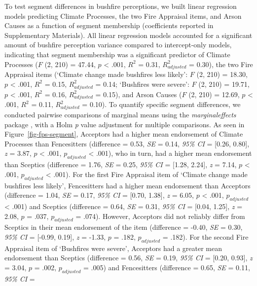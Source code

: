 \documentclass[
  letterpaper,
  DIV=11,
  numbers=noendperiod]{scrartcl}
\begin{document}
To test segment differences in bushfire perceptions, we built linear
regression models predicting Climate Processes, the two Fire Appraisal
items, and Arson Causes as a function of segment membership
(coefficients reported in Supplementary Materials). All linear
regression models accounted for a significant amount of bushfire
perception variance compared to intercept-only models, indicating that
segment membership was a significant predictor of Climate Processes
(\(F\) (2, 210) = 47.44, \(p\) \textless{} .001, \(R^2\) = 0.31,
\(R^2_{adjusted}\) = 0.30), the two Fire Appraisal items (`Climate
change made bushfires less likely': \(F\) (2, 210) = 18.30, \(p\)
\textless{} .001, \(R^2\) = 0.15, \(R^2_{adjusted}\) = 0.14; `Bushfires
were severe': \(F\) (2, 210) = 19.71, \(p\) \textless{} .001, \(R^2\) =
0.16, \(R^2_{adjusted}\) = 0.15), and Arson Causes (\(F\) (2, 210) =
12.69, \(p\) \textless{} .001, \(R^2\) = 0.11, \(R^2_{adjusted}\) =
0.10). To quantify specific segment differences, we conducted pairwise
comparisons of marginal means using the \emph{marginaleffects} package
\citep{R-marginaleffects}, with a Holm \citeyearpar{holm1979} \emph{p}
value adjustment for multiple comparisons. As seen in
Figure~\ref{fig-fps-segment}, Acceptors had a higher mean endorsement of
Climate Processes than Fencesitters (difference = 0.53, \emph{SE} =
0.14, \emph{95\% CI} = {[}0.26, 0.80{]}, \emph{z} = 3.87, \(p\)
\textless{} .001, \(p_{adjusted}\) \textless{} .001), who in turn, had a
higher mean endorsement than Sceptics (difference = 1.76, \emph{SE} =
0.25, \emph{95\% CI} = {[}1.28, 2.24{]}, \emph{z} = 7.14, \(p\)
\textless{} .001, \(p_{adjusted}\) \textless{} .001). For the first Fire
Appraisal item of `Climate change made bushfires less likely',
Fencesitters had a higher mean endorsement than Acceptors (difference =
1.04, \emph{SE} = 0.17, \emph{95\% CI} = {[}0.70, 1.38{]}, \emph{z} =
6.05, \(p\) \textless{} .001, \(p_{adjusted}\) \textless{} .001) and
Sceptics (difference = 0.64, \emph{SE} = 0.31, \emph{95\% CI} = {[}0.04,
1.25{]}, \emph{z} = 2.08, \(p\) = .037, \(p_{adjusted}\) = .074).
However, Acceptors did not reliably differ from Sceptics in their mean
endorsement of the item (difference = -0.40, \emph{SE} = 0.30,
\emph{95\% CI} = {[}-0.99, 0.19{]}, \emph{z} = -1.33, \(p\) = .182,
\(p_{adjusted}\) = .182). For the second Fire Appraisal item of
`Bushfires were severe', Acceptors had a greater mean endorsement than
Sceptics (difference = 0.56, \emph{SE} = 0.19, \emph{95\% CI} = {[}0.20,
0.93{]}, \emph{z} = 3.04, \(p\) = .002, \(p_{adjusted}\) = .005) and
Fencesitters (difference = 0.65, \emph{SE} = 0.11, \emph{95\% CI} =
\end{document}
